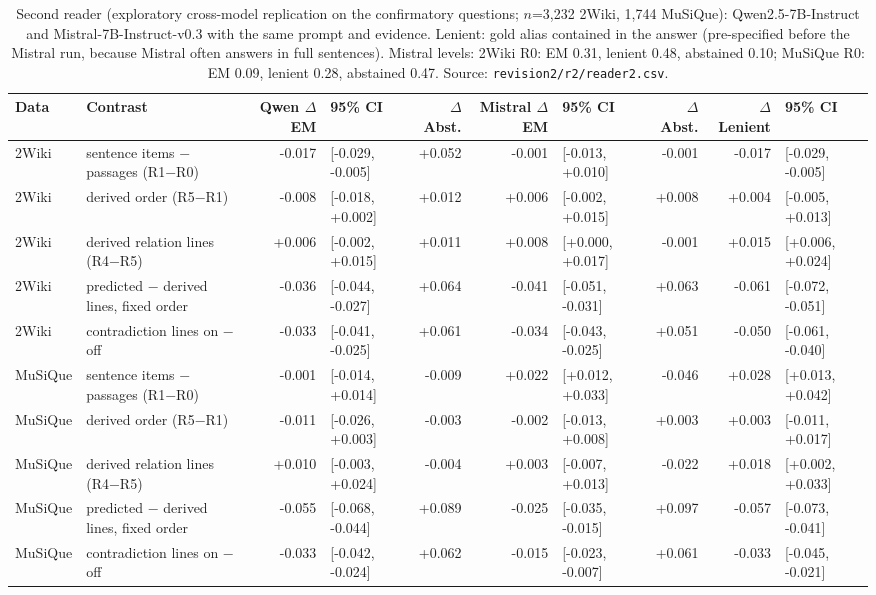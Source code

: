 \begin{table}[t]
\centering
\footnotesize
\begin{adjustbox}{max width=\linewidth}
\begin{tabular}{@{}llrlrrlrrl@{}}
\toprule
Data & Contrast & Qwen $\Delta$EM & 95\% CI & $\Delta$Abst. & Mistral $\Delta$EM & 95\% CI & $\Delta$Abst. & $\Delta$Lenient & 95\% CI \\
\midrule
2Wiki & sentence items $-$ passages (R1$-$R0) & -0.017 & [-0.029, -0.005] & +0.052 & -0.001 & [-0.013, +0.010] & -0.001 & -0.017 & [-0.029, -0.005] \\
2Wiki & derived order (R5$-$R1) & -0.008 & [-0.018, +0.002] & +0.012 & +0.006 & [-0.002, +0.015] & +0.008 & +0.004 & [-0.005, +0.013] \\
2Wiki & derived relation lines (R4$-$R5) & +0.006 & [-0.002, +0.015] & +0.011 & +0.008 & [+0.000, +0.017] & -0.001 & +0.015 & [+0.006, +0.024] \\
2Wiki & predicted $-$ derived lines, fixed order & -0.036 & [-0.044, -0.027] & +0.064 & -0.041 & [-0.051, -0.031] & +0.063 & -0.061 & [-0.072, -0.051] \\
2Wiki & contradiction lines on $-$ off & -0.033 & [-0.041, -0.025] & +0.061 & -0.034 & [-0.043, -0.025] & +0.051 & -0.050 & [-0.061, -0.040] \\
\midrule
MuSiQue & sentence items $-$ passages (R1$-$R0) & -0.001 & [-0.014, +0.014] & -0.009 & +0.022 & [+0.012, +0.033] & -0.046 & +0.028 & [+0.013, +0.042] \\
MuSiQue & derived order (R5$-$R1) & -0.011 & [-0.026, +0.003] & -0.003 & -0.002 & [-0.013, +0.008] & +0.003 & +0.003 & [-0.011, +0.017] \\
MuSiQue & derived relation lines (R4$-$R5) & +0.010 & [-0.003, +0.024] & -0.004 & +0.003 & [-0.007, +0.013] & -0.022 & +0.018 & [+0.002, +0.033] \\
MuSiQue & predicted $-$ derived lines, fixed order & -0.055 & [-0.068, -0.044] & +0.089 & -0.025 & [-0.035, -0.015] & +0.097 & -0.057 & [-0.073, -0.041] \\
MuSiQue & contradiction lines on $-$ off & -0.033 & [-0.042, -0.024] & +0.062 & -0.015 & [-0.023, -0.007] & +0.061 & -0.033 & [-0.045, -0.021] \\
\bottomrule
\end{tabular}
\end{adjustbox}
\caption{Second reader (exploratory cross-model replication on the confirmatory questions; $n$=3{,}232 2Wiki, 1{,}744 MuSiQue): Qwen2.5-7B-Instruct and Mistral-7B-Instruct-v0.3 with the same prompt and evidence. Lenient: gold alias contained in the answer (pre-specified before the Mistral run, because Mistral often answers in full sentences). Mistral levels: 2Wiki R0: EM 0.31, lenient 0.48, abstained 0.10; MuSiQue R0: EM 0.09, lenient 0.28, abstained 0.47. Source: \texttt{revision2/\allowbreak r2/\allowbreak reader2.csv}.}
\label{tab:reader2}
\end{table}
